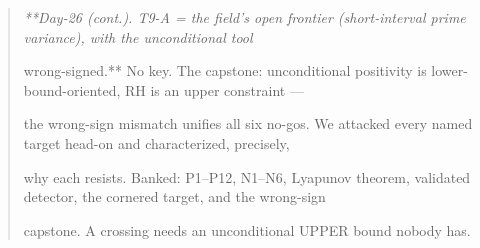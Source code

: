 \documentclass[10pt]{article}
\begin{document}
\begin{quote}\itshape
**Day-26 (cont.). T9-A = the field's open frontier (short-interval prime variance), with the unconditional tool\par
wrong-signed.** No key. The capstone: unconditional positivity is lower-bound-oriented, RH is an upper constraint ---\par
the wrong-sign mismatch unifies all six no-gos. We attacked every named target head-on and characterized, precisely,\par
why each resists. Banked: P1--P12, N1--N6, Lyapunov theorem, validated detector, the cornered target, and the wrong-sign\par
capstone. A crossing needs an unconditional UPPER bound nobody has.\par
\end{quote}
\end{document}
